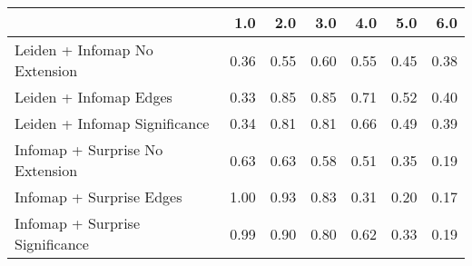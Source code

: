 \begin{tabular}{lrrrrrr}
\toprule
{} &  1.0 &  2.0 &  3.0 &  4.0 &  5.0 &  6.0 \\
\midrule
Leiden + Infomap No Extension   & 0.36 & 0.55 & 0.60 & 0.55 & 0.45 & 0.38 \\
Leiden + Infomap Edges          & 0.33 & 0.85 & 0.85 & 0.71 & 0.52 & 0.40 \\
Leiden + Infomap Significance   & 0.34 & 0.81 & 0.81 & 0.66 & 0.49 & 0.39 \\
Infomap + Surprise No Extension & 0.63 & 0.63 & 0.58 & 0.51 & 0.35 & 0.19 \\
Infomap + Surprise Edges        & 1.00 & 0.93 & 0.83 & 0.31 & 0.20 & 0.17 \\
Infomap + Surprise Significance & 0.99 & 0.90 & 0.80 & 0.62 & 0.33 & 0.19 \\
\bottomrule
\end{tabular}
